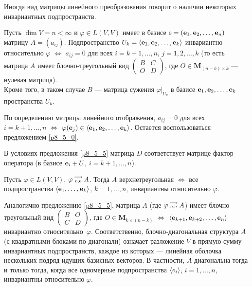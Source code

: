 \otstup

Иногда вид матрицы линейного преобразования говорит о наличии некоторых инвариантных подпространств.

\begin{predl}\label{p8_5_5}
Пусть  $\dim V = n <\infty $ и
$\varphi \in L(V,V)$ имеет в базисе $\mathrm{e} = (\mathbf{e}_1,  \mathbf{e}_2, \ldots , \mathbf{e}_n)$
матрицу $A=(a_{ij})$. Подпространство
$U_k = \langle  \mathbf{e}_1,  \mathbf{e}_2, \ldots , \mathbf{e}_k \rangle$ инвариантно относительно $\varphi$
$\Leftrightarrow$
$a_{ij}=0$ для всех $i=k+1, \ldots, n$, $j=1, 2, \ldots, k$
(то есть матрица $A$ имеет блочно-треугольный вид
$\begin{pmatrix} B & C \\ O & D \end{pmatrix}$, где $O\in \mathbf{M}_{(n-k)\times k}$
--- нулевая матрица).\\
Кроме того, в таком случае $B$ --- матрица сужения $\varphi |_{U_k}$ в базисе
$\mathbf{e}_1,  \mathbf{e}_2, \ldots , \mathbf{e}_k$ пространства $U_k$.
\end{predl}
\dok По определению матрицы линейного отображения, $a_{ij}=0$ для всех $i=k+1, \ldots, n$ $\Leftrightarrow$
$\varphi (\mathbf{e}_j) \in \langle \mathbf{e}_1, \mathbf{e}_2, \ldots, \mathbf{e}_k \rangle$. Остается воспользоваться предложением \ref{p8_5_0}.
\edok


\otstup
{\footnotesize В условиях предложения \ref{p8_5_5} матрица $D$ соответствует матрице фактор-оператора
(в базисе $\mathbf{e}_i+U$, $i=k+1, \ldots, n$).
}


\begin{sled}
Пусть $\varphi \in L(V,V)$, $\varphi \begin{smallmatrix} \longrightarrow \\ \mathrm{e}, \mathrm{e} \end{smallmatrix} A$.
Тогда $A$ верхнетреугольная $\Leftrightarrow$ все подпространства  $\langle \mathbf{e}_1, \ldots , \mathbf{e}_k \rangle$, $k=1, \ldots, n$, инвариантны относительно $\varphi$.
\end{sled}

Аналогично предложению \ref{p8_5_5}, матрица $A$ (где $\varphi \begin{smallmatrix} \longrightarrow \\ \mathrm{e}, \mathrm{e} \end{smallmatrix} A$) имеет блочно-треугольный вид
$\begin{pmatrix} B & O \\ C & D \end{pmatrix}$, где $O\in \mathbf{M}_{k\times (n-k)}$
$\Leftrightarrow$
$\langle  \mathbf{e}_{k+1},  \mathbf{e}_{k+2}, \ldots , \mathbf{e}_n \rangle$ инвариантно относительно~$\varphi$.
Соответственно,  блочно-диагональная структура $A$ (с квадратными блоками по диагонали) означает
разложение $V$  в прямую сумму инвариантных подпространств, каждое из которых --- линейная оболочка нескольких 
подряд идущих базисных векторов. В частности, 
$A$ диагональна тогда  и только тогда, когда все одномерные подпространства $\langle {e}_i \rangle$, $i=1, \ldots, n$, 
инвариантны относительно $\varphi$. 

